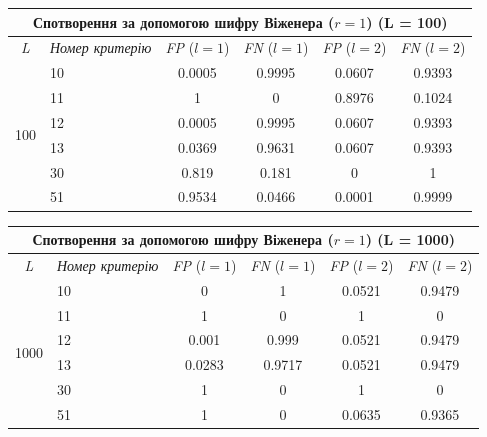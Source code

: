 \documentclass[a4paper,12pt]{article}
\begin{document}
\begin{center}
\renewcommand{\arraystretch}{1.2}
\setlength{\tabcolsep}{6pt}
\begin{tabular}{|c|l||c|c||c|c|}
\hline
\multicolumn{6}{|c|}{Спотворення за допомогою шифру Віженера ($r = 1$) (L = 100)} \\
\hline
\textit{L} & \textit{Номер критерію} & \textit{FP} ($l=1$) & \textit{FN} ($l=1$) & \textit{FP} ($l=2$) & \textit{FN} ($l=2$) \\
\hline
\multirow{6}{*}{100} & 10 & 0.0005 & 0.9995 & 0.0607 & 0.9393 \\
 & 11 & 1 & 0 & 0.8976 & 0.1024 \\
 & 12 & 0.0005 & 0.9995 & 0.0607 & 0.9393 \\
 & 13 & 0.0369 & 0.9631 & 0.0607 & 0.9393 \\
 & 30 & 0.819 & 0.181 & 0 & 1 \\
 & 51 & 0.9534 & 0.0466 & 0.0001 & 0.9999 \\
\hline
\end{tabular}
\end{center}

\begin{center}
\renewcommand{\arraystretch}{1.2}
\setlength{\tabcolsep}{6pt}
\begin{tabular}{|c|l||c|c||c|c|}
\hline
\multicolumn{6}{|c|}{Спотворення за допомогою шифру Віженера ($r = 1$) (L = 1000)} \\
\hline
\textit{L} & \textit{Номер критерію} & \textit{FP} ($l=1$) & \textit{FN} ($l=1$) & \textit{FP} ($l=2$) & \textit{FN} ($l=2$) \\
\hline
\multirow{6}{*}{1000} & 10 & 0 & 1 & 0.0521 & 0.9479 \\
 & 11 & 1 & 0 & 1 & 0 \\
 & 12 & 0.001 & 0.999 & 0.0521 & 0.9479 \\
 & 13 & 0.0283 & 0.9717 & 0.0521 & 0.9479 \\
 & 30 & 1 & 0 & 1 & 0 \\
 & 51 & 1 & 0 & 0.0635 & 0.9365 \\
\hline
\end{tabular}
\end{center}
\end{document}
